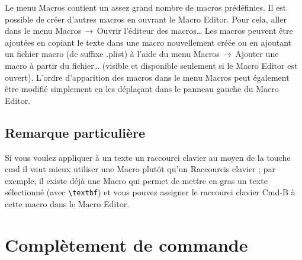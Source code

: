 \documentclass[11pt,french]{article}
\newcommand{\esckey}{\textsf{esc}}
\newcommand{\tabkey}{---\kern-5pt>|}
\newcommand{\mnu}[1]{\textsf{#1}}
\newcommand{\cmd}[1]{\textsf{#1}}
\newcommand{\To}{\,\(\to\)\,}
\begin{document}
Le menu \mnu{Macros} contient un assez grand nombre de macros prédéfinies. Il est possible de créer d'autres macros en ouvrant le \cmd{Macro Editor}. Pour cela, aller dans le menu \mnu{Macros}\To\mnu{Ouvrir l'éditeur des macros…} Les macros peuvent être ajoutées en copiant le texte dans une macro nouvellement créée ou en ajoutant un fichier macro (de suffixe \cmd{.plist}) à l'aide du menu \mnu{Macros}\To\mnu{Ajouter une macro à partir du fichier…} (visible et disponible seulement si le \cmd{Macro Editor} est ouvert). L'ordre d'apparition des macros dans le menu \mnu{Macros} peut également être modifié simplement en les déplaçant dans le panneau gauche du \cmd{Macro Editor}.

\subsection{Remarque particulière}


Si vous voulez appliquer à un texte un raccourci clavier au moyen de la touche \cmd{cmd} il vaut mieux utiliser une \cmd{Macro} plutôt qu'un \cmd{Raccourcis clavier} ; par exemple, il existe déjà une \cmd{Macro} qui permet de mettre en gras un texte sélectionné (avec \verb+\textbf+) et vous pouvez assigner le raccourci clavier \cmd{Cmd-B} à cette \cmd{macro} dans le \cmd{Macro Editor}.

\section{\cmd{Complètement de commande}}

\end{document}
